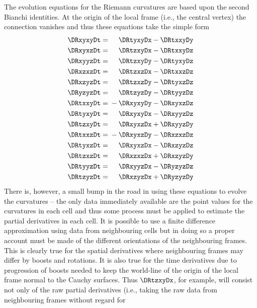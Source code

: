 \documentclass[a4paper,12pt]{article}
\numberwithin{equation}{section}
\begin{document}
The evolution equations for the Riemann curvatures are based upon the second
Bianchi identities. At the origin of the local frame (i.e., the central vertex)
the connection vanishes and thus these equations take the simple form
\bgroup
\def\P{\phantom{{}+{}}}
\def\M{{}-{}}
\begin{align}
\label{eqn:DotRabcdA}\DRxyxyDt &= \P \DRtyxyDx - \DRtxxyDy\\
\label{eqn:DotRabcdB}\DRxyxzDt &= \P \DRtzxyDx - \DRtxxyDz\\
\label{eqn:DotRabcdC}\DRxyyzDt &= \P \DRtzxyDy - \DRtyxyDz\\
\label{eqn:DotRabcdD}\DRxzxzDt &= \P \DRtzxzDx - \DRtxxzDz\\
\label{eqn:DotRabcdE}\DRxzyzDt &= \P \DRtzxzDy - \DRtyxzDz\\
\label{eqn:DotRabcdF}\DRyzyzDt &= \P \DRtzyzDy - \DRtyyzDz\\
\label{eqn:DotRabcdG}\DRtxxyDt &= \M \DRxyxyDy - \DRxyxzDz\\
\label{eqn:DotRabcdH}\DRtyxyDt &= \P \DRxyxyDx - \DRxyyzDz\\
\label{eqn:DotRabcdI}\DRtzxyDt &= \P \DRxyxzDx + \DRxyyzDy\\
\label{eqn:DotRabcdJ}\DRtxxzDt &= \M \DRxyxzDy - \DRxzxzDz\\
\label{eqn:DotRabcdK}\DRtyxzDt &= \P \DRxyxzDx - \DRxzyzDz\\
\label{eqn:DotRabcdL}\DRtzxzDt &= \P \DRxzxzDx + \DRxzyzDy\\
\label{eqn:DotRabcdM}\DRtyyzDt &= \P \DRxyyzDx - \DRyzyzDz\\
\label{eqn:DotRabcdN}\DRtzyzDt &= \P \DRxzyzDx + \DRyzyzDy
\end{align}
\egroup
There is, however, a small bump in the road in using these equations to evolve the
curvatures -- the only data immediately available are the point values for the curvatures in
each cell and thus some process must be applied to estimate the partial derivatives in each
cell. It is possible to use a finite difference approximation using data from neighbouring
cells but in doing so a proper account must be made of the different orientations of the
neighbouring frames. This is clearly true for the spatial derivatives where neighbouring
frames may differ by boosts and rotations. It is also true for the time derivatives due to
progression of boosts needed to keep the world-line of the origin of the local frame normal
to the Cauchy surfaces. Thus $\DRtzxyDx$, for example, will consist not only of the raw
partial derivatives (i.e., taking the raw data from neighbouring frames without regard for
\end{document}
